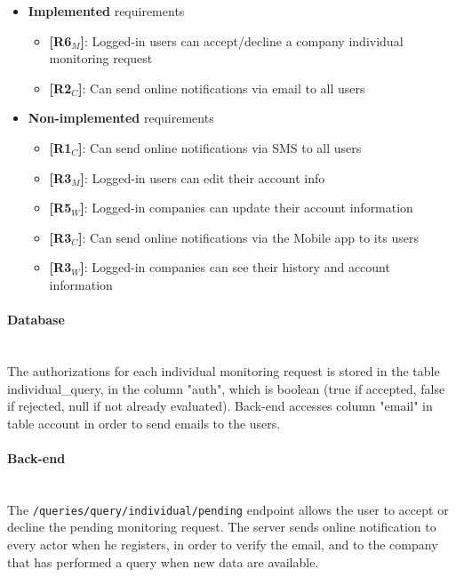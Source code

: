 \begin{itemize}
    \item \textbf{Implemented} requirements
        \begin{itemize}
      
    \item \textbf{[R6$_M$]}: Logged-in users can accept/decline a company individual monitoring request
   
    \item \textbf{[R2$_C$]}: Can send online notifications via email to all users
    

        \end{itemize}
    \item \textbf{Non-implemented} requirements
    \begin{itemize}
    
    
    \item \textbf{[R1$_C$]}: Can send online notifications via SMS to all users 
    \item \textbf{[R3$_M$]}: Logged-in users can edit their account info
    \item \textbf{[R5$_W$]}: Logged-in companies can update their account information
    \item \textbf{[R3$_C$]}: Can send online notifications via the Mobile app to its users
    \item \textbf{[R3$_W$]}: Logged-in companies can see their history and account information
        \end{itemize}

\end{itemize}

\paragraph{Database} \mbox{}\\
The authorizations for each individual monitoring request is stored in the table individual\_query, in the column "auth", which is boolean (true if accepted, false if rejected, null if not already evaluated).
Back-end accesses column "email" in table account in order to send emails to the users.


\paragraph{Back-end} \mbox{}\\
The \texttt{/queries/query/individual/pending} endpoint allows the user to accept or decline the pending monitoring request.
The server sends online notification to every actor when he registers, in order to verify the email, and to the company that has performed a query when new data are available.

